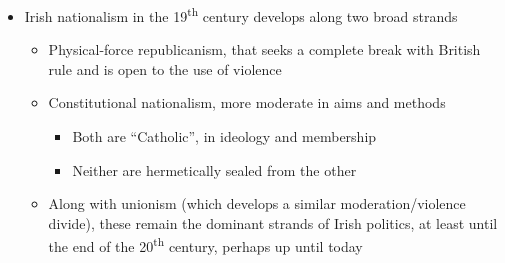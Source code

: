 \documentclass[12pt]{article}
\def\th{\textsuperscript{th}}
\begin{document}
\begin{itemize}
\begin{itemize}
\begin{itemize}
                    \end{itemize}
                \end{itemize}
                \item Irish nationalism in the 19\th{} century develops along two broad strands
                \begin{itemize}
                    \item Physical-force republicanism, that seeks a complete break with British rule and is open to the use of violence
                    \item Constitutional nationalism, more moderate in aims and methods
                    \begin{itemize}
                        \item Both are ``Catholic'', in ideology and membership
                        \item Neither are hermetically sealed from the other
                    \end{itemize}
                    \item Along with unionism (which develops a similar moderation/violence divide), these remain the dominant strands of Irish politics, at least until the end of the 20\th{} century, perhaps up until today
                \end{itemize}
            \end{itemize}
\end{document}
